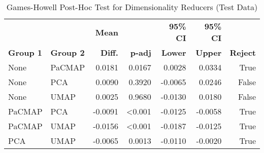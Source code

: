 \begin{table}[!ht]
    \captionsetup{skip=5pt}
\centering
\caption{Games-Howell Post-Hoc Test for Dimensionality Reducers (Test Data)}
\label{tbl:games_howell_dim_reducer_full}
        \begin{tabular}{llrrrrr}
            \toprule
             &  & \textbf{Mean} &  & \textbf{95\% CI} & \textbf{95\% CI} & \\
            \textbf{Group 1} & \textbf{Group 2} & \textbf{Diff.} & \textbf{p-adj} & \textbf{Lower} & \textbf{Upper} & \textbf{Reject}\\
\midrule
None & PaCMAP & 0.0181 & 0.0167 & 0.0028 & 0.0334 & True \\
None & PCA & 0.0090 & 0.3920 & -0.0065 & 0.0246 & False \\
None & UMAP & 0.0025 & 0.9680 & -0.0130 & 0.0180 & False \\
PaCMAP & PCA & -0.0091 & <0.001 & -0.0125 & -0.0058 & True \\
PaCMAP & UMAP & -0.0156 & <0.001 & -0.0187 & -0.0125 & True \\
PCA & UMAP & -0.0065 & 0.0013 & -0.0110 & -0.0020 & True \\
\bottomrule
\end{tabular}
\end{table}

\begin{table}[!ht]
    \captionsetup{skip=5pt}
\centering
\caption{Descriptive Statistics for F1-Scores by Number of Dimensions (Test Data)}
\label{tbl:desc_stats_num_dim}
\end{table}

